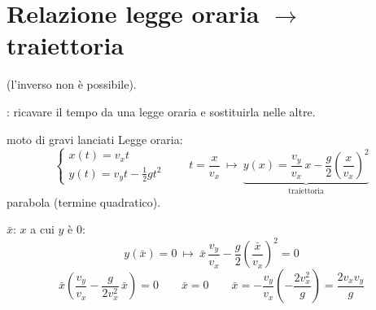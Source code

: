 \documentclass[11pt,a4paper,openany]{report}
\begin{document}
\section{Relazione legge oraria \texorpdfstring{$\to$}{->} traiettoria}
 (l'inverso non è possibile).

: ricavare il tempo da una legge oraria e sostituirla nelle altre.

\begin{esempio}{moto di gravi lanciati}
Legge oraria:
\[
  \begin{cases}
    x(t) = v_x t \\
    y(t) = v_y t - \frac12 g t^2
  \end{cases}
  \qquad
  t = \frac{x}{v_x} \ \longmapsto\
  \underbrace{y(x) = \frac{v_y}{v_x}\,x - \frac{g}{2}\left(\frac{x}{v_x}\right)^2}_{\text{traiettoria}}
\]
\implica parabola (termine quadratico).

$\bar{x}$: $x$ a cui $y$ è $0$:
\[
  y(\bar{x}) = 0 \ \longmapsto\ \bar{x}\,\frac{v_y}{v_x} - \frac{g}{2}\left(\frac{\bar{x}}{v_x}\right)^2 = 0
\]
\[
  \bar{x}\left(\frac{v_y}{v_x} - \frac{g}{2v_x^2}\,\bar{x}\right) = 0
  \qquad \bar{x} = 0
  \qquad \bar{x} = -\frac{v_y}{v_x}\left(-\frac{2v_x^2}{g}\right) = \frac{2v_xv_y}{g}
\]
\begin{disegno}
\end{disegno}
\end{esempio}
\end{document}
